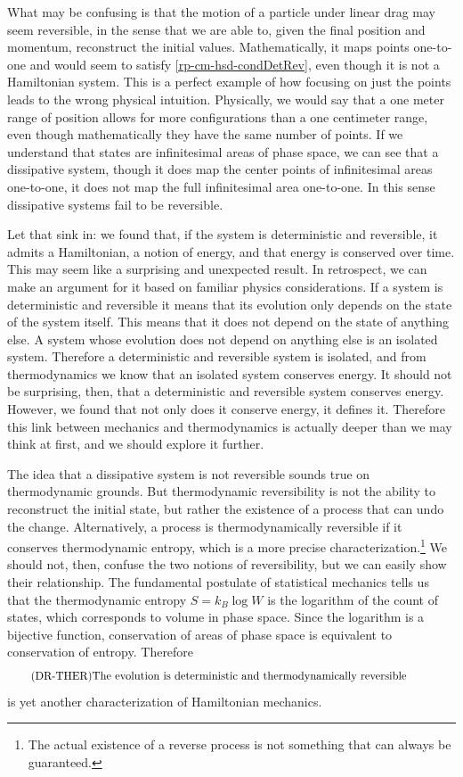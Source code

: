 What may be confusing is that the motion of a particle under linear drag may seem reversible, in the sense that we are able to, given the final position and momentum, reconstruct the initial values. Mathematically, it maps points one-to-one and would seem to satisfy \ref{rp-cm-hsd-condDetRev}, even though it is not a Hamiltonian system. This is a perfect example of how focusing on just the points leads to the wrong physical intuition. Physically, we would say that a one meter range of position allows for more configurations than a one centimeter range, even though mathematically they have the same number of points. If we understand that states are infinitesimal areas of phase space, we can see that a dissipative system, though it does map the center points of infinitesimal areas one-to-one, it does not map the full infinitesimal area one-to-one. In this sense dissipative systems fail to be reversible.

Let that sink in: we found that, if the system is deterministic and reversible, it admits a Hamiltonian, a notion of energy, and that energy is conserved over time. This may seem like a surprising and unexpected result. In retrospect, we can make an argument for it based on familiar physics considerations. If a system is deterministic and reversible it means that its evolution only depends on the state of the system itself. This means that it does not depend on the state of anything else. A system whose evolution does not depend on anything else is an isolated system. Therefore a deterministic and reversible system is isolated, and from thermodynamics we know that an isolated system conserves energy. It should not be surprising, then, that a deterministic and reversible system conserves energy. However, we found that not only does it conserve energy, it defines it. Therefore this link between mechanics and thermodynamics is actually deeper than we may think at first, and we should explore it further.

The idea that a dissipative system is not reversible sounds true on thermodynamic grounds. But thermodynamic reversibility is not the ability to reconstruct the initial state, but rather the existence of a process that can undo the change. Alternatively, a process is  thermodynamically reversible if it conserves thermodynamic entropy, which is a more precise characterization.\footnote{The actual existence of a reverse process is not something that can always be guaranteed.} We should not, then, confuse the two notions of reversibility, but we can easily show their relationship. The fundamental postulate of statistical mechanics tells us that the thermodynamic entropy $S = k_B \log W$ is the logarithm of the count of states, which corresponds to volume in phase space. Since the logarithm is a bijective function, conservation of areas of phase space is equivalent to conservation of entropy. Therefore
\begin{equation}\label{rp-cm-hsd-condThermoRev}
	\tag{DR-THER}
	\eqtext{The evolution is deterministic and thermodynamically reversible}	
\end{equation}
is yet another characterization of Hamiltonian mechanics.

